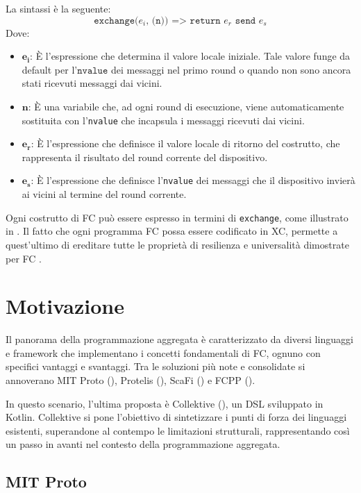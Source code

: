 La sintassi è la seguente:
%
\[
\texttt{exchange(\(e_i\), (n)) => return \(e_r\) send \(e_s\)}
\]
%
Dove:
\begin{itemize}
    \item \(\mathbf{e_i}\): È l'espressione che determina il valore locale iniziale. Tale valore funge da default per l'$\texttt{nvalue}$ dei messaggi nel primo round o quando non sono ancora stati ricevuti messaggi dai vicini.
    \item \(\mathbf{n}\): È una variabile che, ad ogni round di esecuzione, viene automaticamente sostituita con l'\texttt{nvalue} che incapsula i messaggi ricevuti dai vicini.
    \item \(\mathbf{e_r}\): È l'espressione che definisce il valore locale di ritorno del costrutto, che rappresenta il risultato del round corrente del dispositivo.
    \item \(\mathbf{e_s}\): È l'espressione che definisce l'\texttt{nvalue} dei messaggi che il dispositivo invierà ai vicini al termine del round corrente.
\end{itemize}

Ogni costrutto di \ac{FC} può essere espresso in termini di \texttt{exchange}, come illustrato in \cite{XC}. Il fatto che ogni programma \ac{FC} possa essere codificato in \ac{XC}, permette a quest'ultimo di ereditare tutte le proprietà di resilienza e universalità dimostrate per \ac{FC} \cite{UniversalityFC}.

\newpage
\section{Motivazione}
\label{sec:motivazione}

Il panorama della programmazione aggregata è caratterizzato da diversi linguaggi e framework che implementano i concetti fondamentali di \ac{FC}, ognuno con specifici vantaggi e svantaggi. 
Tra le soluzioni più note e consolidate si annoverano MIT Proto \cite{proto} (), Protelis \cite{protelis} (), ScaFi \cite{scafi} () e FCPP \cite{fcpp} (). 

In questo scenario, l'ultima proposta è Collektive (), un \ac{DSL} sviluppato in Kotlin. Collektive si pone l'obiettivo di sintetizzare i punti di forza dei linguaggi esistenti, superandone al contempo le limitazioni strutturali, rappresentando così un passo in avanti nel contesto della programmazione aggregata.


\subsection{MIT Proto}
\label{sec:mitproto}

